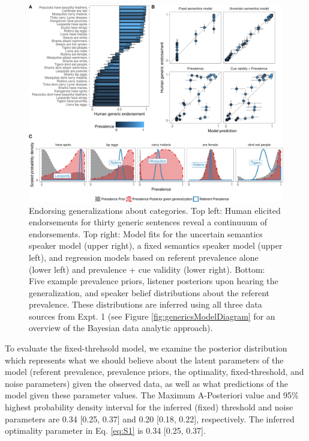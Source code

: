 \documentclass[english,floatsintext,man]{apa6}
\theoremstyle{definition}
\theoremstyle{definition}
\theoremstyle{definition}
\theoremstyle{remark}
\begin{document}
\begin{figure}[htbp]
\centering
\includegraphics{figs/generics-endorsement-figure-1.pdf}
\caption{\label{fig:generics-endorsement-figure}Endorsing generalizations
about categories. Top left: Human elicited endorsements for thirty
generic sentences reveal a continuuum of endorsements. Top right: Model
fits for the uncertain semantics speaker model (upper right), a fixed
semantics speaker model (upper left), and regression models based on
referent prevalence alone (lower left) and prevalence + cue validity
(lower right). Bottom: Five example prevalence priors, listener
posteriors upon hearing the generalization, and speaker belief
distributions about the referent prevalence. These distributions are
inferred using all three data sources from Expt. 1 (see Figure
\ref{fig:genericsModelDiagram} for an overview of the Bayesian data
analytic approach).}
\end{figure}

To evaluate the fixed-threhsold model, we examine the posterior
distribution which represents what we should believe about the latent
parameters of the model (referent prevalence, prevalence priors, the
optimality, fixed-threshold, and noise parameters) given the observed
data, as well as what predictions of the model given these parameter
values. The Maximum A-Posteriori value and 95\% highest probability
density interval for the inferred (fixed) threshold and noise parameters
are 0.34 {[}0.25, 0.37{]} and 0.20 {[}0.18, 0.22{]}, respectively. The
inferred optimality parameter in Eq. \ref{eq:S1} is 0.34 {[}0.25,
0.37{]}.
\end{document}
